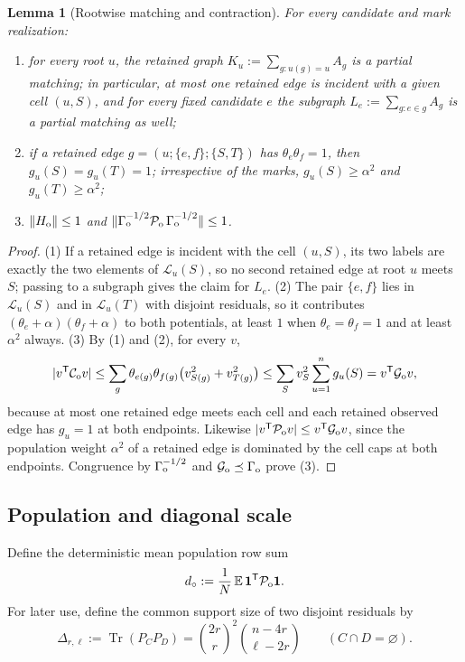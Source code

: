 \documentclass[11pt]{article}
\newtheorem{lemma}[lemma]{Lemma}
\theoremstyle{definition}
\theoremstyle{remark}
\newcommand{\E}{\mathbb E}
\newcommand{\1}{\mathbf 1}
\newcommand{\cC}{\mathcal C}
\newcommand{\cG}{\mathcal G}
\newcommand{\cL}{\mathcal L}
\newcommand{\cP}{\mathcal P}
\DeclareMathOperator{\Tr}{Tr}
\numberwithin{equation}{section}
\begin{document}
\begin{lemma}[Rootwise matching and contraction]\label{lem:odd-uniqueness}
For every candidate and mark realization:
\begin{enumerate}
\item for every root $u$, the retained graph
$K_u:=\sum_{g:u(g)=u}A_g$ is a partial matching; in particular, at most
one retained edge is incident with a given cell $(u,S)$, and for every
fixed candidate $e$ the subgraph $L_e:=\sum_{g:e\in g}A_g$ is a partial
matching as well;
\item if a retained edge $g=(u;\{e,f\};\{S,T\})$ has
$\theta_e\theta_f=1$, then $g_u(S)=g_u(T)=1$; irrespective of the
marks, $g_u(S)\ge\alpha^2$ and $g_u(T)\ge\alpha^2$;
\item $\|H_{\rm o}\|\le1$ and
$\|\Gamma_{\rm o}^{-1/2}\cP_{\rm o}\,\Gamma_{\rm o}^{-1/2}\|\le1$.
\end{enumerate}
\end{lemma}
\begin{proof}
(1) If a retained edge is incident with the cell $(u,S)$, its two
labels are exactly the two elements of $\cL_u(S)$, so no second
retained edge at root $u$ meets $S$; passing to a subgraph gives the
claim for $L_e$.  (2) The pair $\{e,f\}$ lies in $\cL_u(S)$ and in
$\cL_u(T)$ with disjoint residuals, so it contributes
$(\theta_e+\alpha)(\theta_f+\alpha)$ to both potentials, at least $1$
when $\theta_e=\theta_f=1$ and at least $\alpha^2$ always.  (3) By (1)
and (2), for every $v$,
\[
 |v^{\mathsf T}\cC_{\rm o}v|
 \le\sum_g\theta_{e(g)}\theta_{f(g)}
 \bigl(v_{S(g)}^2+v_{T(g)}^2\bigr)
 \le\sum_Sv_S^2\sum_{u=1}^ng_u(S)
 =v^{\mathsf T}\cG_{\rm o}v,
\]
because at most one retained edge meets each cell and each retained
observed edge has $g_u=1$ at both endpoints.  Likewise
$|v^{\mathsf T}\cP_{\rm o}v|\le v^{\mathsf T}\cG_{\rm o}v$, since the
population weight $\alpha^2$ of a retained edge is dominated by the
cell caps at both endpoints.  Congruence by $\Gamma_{\rm o}^{-1/2}$ and
$\cG_{\rm o}\preceq\Gamma_{\rm o}$ prove (3).
\end{proof}

\subsection{Population and diagonal scale}

Define the deterministic mean population row sum
\begin{equation}\label{eq:odd-population-def}
 d_\circ:=\frac1N\,\E\,\1^{\mathsf T}\cP_{\rm o}\1 .
\end{equation}
For later use, define the common support size of two disjoint residuals
by
\begin{equation}\label{eq:odd-Delta}
 \Delta_{r,\ell}:=\Tr(P_CP_D)
 =\binom{2r}{r}^{2}\binom{n-4r}{\ell-2r}
 \qquad(C\cap D=\varnothing).
\end{equation}
\end{document}
